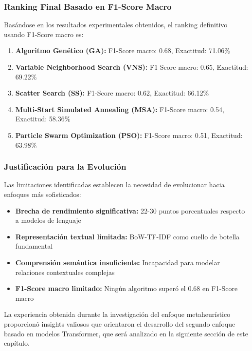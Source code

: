 \subsubsection{Ranking Final Basado en F1-Score Macro}

Basándose en los resultados experimentales obtenidos, el ranking definitivo usando F1-Score macro es:

\begin{enumerate}
    \item \textbf{Algoritmo Genético (GA):} F1-Score macro: 0.68, Exactitud: 71.06\%
    \item \textbf{Variable Neighborhood Search (VNS):} F1-Score macro: 0.65, Exactitud: 69.22\%
    \item \textbf{Scatter Search (SS):} F1-Score macro: 0.62, Exactitud: 66.12\%
    \item \textbf{Multi-Start Simulated Annealing (MSA):} F1-Score macro: 0.54, Exactitud: 58.36\%
    \item \textbf{Particle Swarm Optimization (PSO):} F1-Score macro: 0.51, Exactitud: 63.98\%
\end{enumerate}

\subsubsection{Justificación para la Evolución}

Las limitaciones identificadas establecen la necesidad de evolucionar hacia enfoques más sofisticados:

\begin{itemize}
    \item \textbf{Brecha de rendimiento significativa:} 22-30 puntos porcentuales respecto a modelos de lenguaje
    \item \textbf{Representación textual limitada:} BoW-TF-IDF como cuello de botella fundamental
    \item \textbf{Comprensión semántica insuficiente:} Incapacidad para modelar relaciones contextuales complejas
    \item \textbf{F1-Score macro limitado:} Ningún algoritmo superó el 0.68 en F1-Score macro
\end{itemize}

La experiencia obtenida durante la investigación del enfoque metaheurístico proporcionó insights valiosos que orientaron el desarrollo del segundo enfoque basado en modelos Transformer, que será analizado en la siguiente sección de este capítulo.

